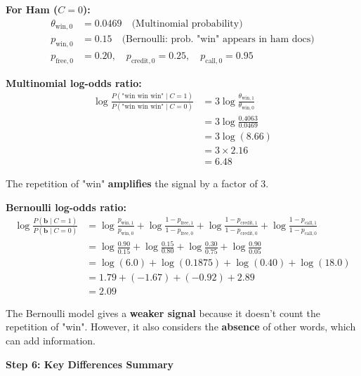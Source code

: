 \documentclass[12pt]{article}
\begin{document}
\begin{solution}
\textbf{For Ham ($C=0$):}
\begin{align*}
\theta_{\text{win},0} &= 0.0469 \quad \text{(Multinomial probability)} \\
p_{\text{win},0} &= 0.15 \quad \text{(Bernoulli: prob. "win" appears in ham docs)} \\
p_{\text{free},0} &= 0.20, \quad p_{\text{credit},0} = 0.25, \quad p_{\text{call},0} = 0.95
\end{align*}

\textbf{Multinomial log-odds ratio:}
\begin{align*}
\log \frac{P(\text{"win win win"} \mid C=1)}{P(\text{"win win win"} \mid C=0)} &= 3 \log \frac{\theta_{\text{win},1}}{\theta_{\text{win},0}} \\
&= 3 \log \frac{0.4063}{0.0469} \\
&= 3 \log(8.66) \\
&= 3 \times 2.16 \\
&= \boxed{6.48}
\end{align*}

The repetition of "win" \textbf{amplifies} the signal by a factor of 3.

\textbf{Bernoulli log-odds ratio:}
\begin{align*}
\log \frac{P(\mathbf{b} \mid C=1)}{P(\mathbf{b} \mid C=0)} &= \log \frac{p_{\text{win},1}}{p_{\text{win},0}} + \log \frac{1-p_{\text{free},1}}{1-p_{\text{free},0}} + \log \frac{1-p_{\text{credit},1}}{1-p_{\text{credit},0}} + \log \frac{1-p_{\text{call},1}}{1-p_{\text{call},0}} \\
&= \log \frac{0.90}{0.15} + \log \frac{0.15}{0.80} + \log \frac{0.30}{0.75} + \log \frac{0.90}{0.05} \\
&= \log(6.0) + \log(0.1875) + \log(0.40) + \log(18.0) \\
&= 1.79 + (-1.67) + (-0.92) + 2.89 \\
&= \boxed{2.09}
\end{align*}

The Bernoulli model gives a \textbf{weaker signal} because it doesn't count the repetition of "win". However, it also considers the \textbf{absence} of other words, which can add information.

\textbf{Step 6: Key Differences Summary}


\end{solution}
\end{document}
